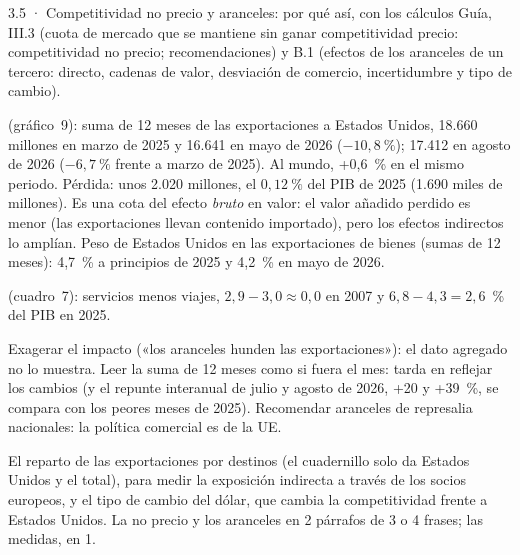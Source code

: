 \begin{complemento}{3.5 · Competitividad no precio y aranceles: por qué así, con los cálculos}
 Guía, III.3 (cuota de mercado que se mantiene sin ganar competitividad precio: competitividad no precio; recomendaciones) y B.1 (efectos de los aranceles de un tercero: directo, cadenas de valor, desviación de comercio, incertidumbre y tipo de cambio).

\begin{figuracaja}
\caption{Los canales de un choque externo (infografía de la guía)}\label{fig:canales-choque}
\end{figuracaja}

 (gráfico~9): suma de 12 meses de las exportaciones a Estados Unidos, 18.660 millones en marzo de 2025 y 16.641 en mayo de 2026 ($-10{,}8~\%$); 17.412 en agosto de 2026 ($-6{,}7~\%$ frente a marzo de 2025). Al mundo, +0,6~\% en el mismo periodo. Pérdida: unos 2.020 millones, el $0{,}12~\%$ del PIB de 2025 (1.690 miles de millones). Es una cota del efecto \emph{bruto} en valor: el valor añadido perdido es menor (las exportaciones llevan contenido importado), pero los efectos indirectos lo amplían. Peso de Estados Unidos en las exportaciones de bienes (sumas de 12 meses): 4,7~\% a principios de 2025 y 4,2~\% en mayo de 2026.

 (cuadro~7): servicios menos viajes, $2{,}9-3{,}0\approx0{,}0$ en 2007 y $6{,}8-4{,}3=2{,}6$~\% del PIB en 2025.

 Exagerar el impacto («los aranceles hunden las exportaciones»): el dato agregado no lo muestra. Leer la suma de 12 meses como si fuera el mes: tarda en reflejar los cambios (y el repunte interanual de julio y agosto de 2026, +20 y +39~\%, se compara con los peores meses de 2025). Recomendar aranceles de represalia nacionales: la política comercial es de la UE.

 El reparto de las exportaciones por destinos (el cuadernillo solo da Estados Unidos y el total), para medir la exposición indirecta a través de los socios europeos, y el tipo de cambio del dólar, que cambia la competitividad frente a Estados Unidos.  La no precio y los aranceles en 2 párrafos de 3 o 4 frases; las medidas, en 1.
\end{complemento}

